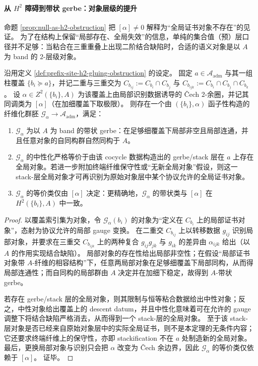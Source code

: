 \paragraph{从 \(H^2\) 障碍到带状 gerbe：对象层级的提升}
命题 \ref{prop:null-as-h2-obstruction} 把 \([\alpha]\neq 0\) 解释为“全局证书对象不存在”的见证。
为了在结构上保留“局部存在、全局失效”的信息，单纯的集合值（预）层口径并不足够：当粘合在三重重叠上出现二阶结合缺陷时，合适的语义对象是以 \(A\) 为 band 的 \(2\)-层级对象。

\begin{theorem}\label{thm:prefix-site-cech-null-gerbe}
沿用定义 \ref{def:prefix-site-h2-gluing-obstruction} 的设定。
固定 \(a\in\mathcal{A}_{\mathrm{adm}}\) 与其一组柱覆盖 \(\{b_i\succeq a\}\)，并记二重与三重交为
\(
C_{b_{ij}}:=C_{b_i}\cap C_{b_j}
\)
与
\(
C_{b_{ijk}}:=C_{b_i}\cap C_{b_j}\cap C_{b_k}
\)。
设 \(\alpha\in Z^2(\{b_i\},A)\) 为该覆盖上由局部识别数据诱导的 Čech \(2\)-余圈，并记其同调类为 \([\alpha]\)（在加细覆盖下取极限）。
则存在一个由 \((\{b_i\},\alpha)\) 函子性构造的纤维化群胚 \(\mathcal{G}_\alpha\to \mathcal{A}_{\mathrm{adm}}\)，满足：
\begin{enumerate}
  \item \(\mathcal{G}_\alpha\) 为以 \(A\) 为 band 的带状 gerbe：在足够细覆盖下局部非空且局部连通，并且任意对象的自同构群自然同构于 \(A\)。
  \item \(\mathcal{G}_\alpha\) 的中性化严格等价于由该 cocycle 数据构造出的 gerbe/stack 层在 \(a\) 上存在全局对象。若进一步附加终端纤维保守性或“无新全局对象”假设，则这一 stack-层全局对象才可再识别为原始对象层中某个协议允许的全局证书对象。
  \item \(\mathcal{G}_\alpha\) 的等价类仅由 \([\alpha]\) 决定：更精确地，\(\mathcal{G}_\alpha\) 的带状类与 \([\alpha]\) 在 \(H^2(\{b_i\},A)\) 中一致。
\end{enumerate}
\end{theorem}

\begin{proof}
以覆盖索引集为对象，令 \(\mathcal{G}_\alpha(b_i)\) 的对象为“定义在 \(C_{b_i}\) 上的局部证书对象”，态射为协议允许的局部 gauge 变换。
在二重交 \(C_{b_{ij}}\) 上以转移数据 \(g_{ij}\) 识别局部对象，并要求在三重交 \(C_{b_{ijk}}\) 上的两种复合 \(g_{ij}g_{jk}\) 与 \(g_{ik}\) 的差异由 \(\alpha_{ijk}\) 给出（以 \(A\) 的作用实现结合缺陷）。
局部对象的存在性给出局部非空性；在假设“局部证书对象带 \(A\)-纤维的相容结构”下，任意两局部对象在足够细覆盖下局部同构，从而得局部连通性；而自同构的局部群由 \(A\) 决定并在加细下稳定，故得到 \(A\)-带状 gerbe。
\par
若存在 gerbe/stack 层的全局对象，则其限制与恒等粘合数据给出中性对象；反之，中性对象给出覆盖上的 descent datum，并且中性化意味着可在允许的 gauge 调整下将结合缺陷严格消去，从而得到一个 stack-层的全局对象。
至于该 stack-层对象是否已经来自原始对象层中的实际全局证书，则不是本定理的无条件内容；它还要求终端纤维上的保守性，亦即 stackification 不在 \(a\) 处制造新的全局对象。
最后，更换局部对象与识别只会把 \(\alpha\) 改变为 Čech 余边界，因此 \(\mathcal{G}_\alpha\) 的等价类仅依赖于 \([\alpha]\)。
证毕。
\end{proof}

